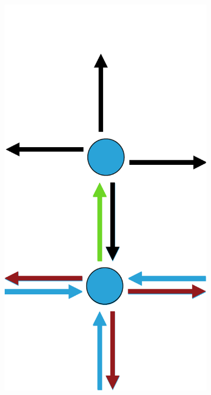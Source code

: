 \documentclass[12pt]{article}
\begin{document}
\begin{figure}[tb]
\begin{subfigure}[b]{0.15\textwidth}
      \includegraphics[width=\textwidth]{img/4}
      \caption{}\label{fig:contraction_kernel_greedy4}
  \end{subfigure}
  ~
  \begin{subfigure}[b]{0.15\textwidth}

\end{subfigure}
\end{figure}
\end{document}
